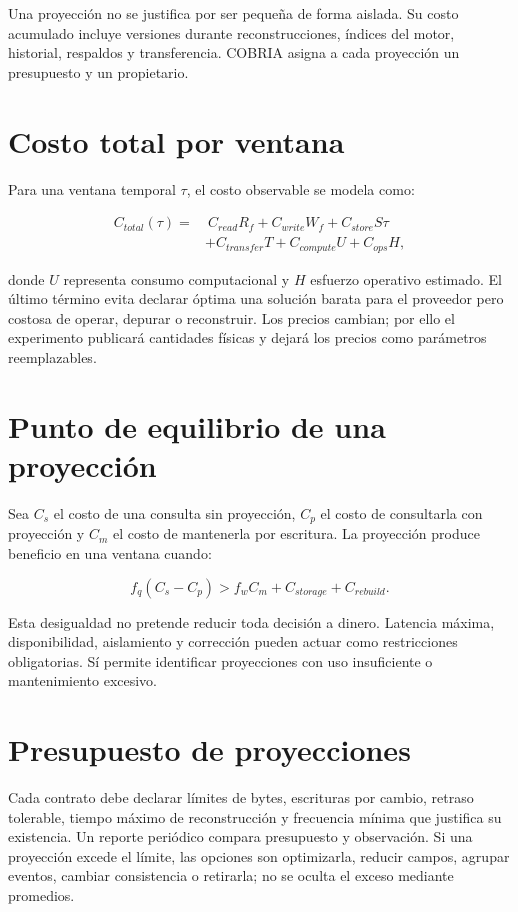 Una proyección no se justifica por ser pequeña de forma aislada. Su costo acumulado
incluye versiones durante reconstrucciones, índices del motor, historial, respaldos y
transferencia. COBRIA asigna a cada proyección un presupuesto y un propietario.

\section{Costo total por ventana}

Para una ventana temporal $\tau$, el costo observable se modela como:

\begin{align}
C_{total}(\tau)=&\ C_{read}R_f + C_{write}W_f + C_{store}S\tau \\
&+ C_{transfer}T + C_{compute}U + C_{ops}H,
\label{eq:costo-total}
\end{align}

donde $U$ representa consumo computacional y $H$ esfuerzo operativo estimado. El último
término evita declarar óptima una solución barata para el proveedor pero costosa de
operar, depurar o reconstruir. Los precios cambian; por ello el experimento publicará
cantidades físicas y dejará los precios como parámetros reemplazables.

\section{Punto de equilibrio de una proyección}

Sea $C_s$ el costo de una consulta sin proyección, $C_p$ el costo de consultarla con
proyección y $C_m$ el costo de mantenerla por escritura. La proyección produce beneficio
en una ventana cuando:

\begin{equation}
f_q(C_s-C_p)>f_wC_m+C_{storage}+C_{rebuild}.
\label{eq:break-even}
\end{equation}

Esta desigualdad no pretende reducir toda decisión a dinero. Latencia máxima,
disponibilidad, aislamiento y corrección pueden actuar como restricciones obligatorias.
Sí permite identificar proyecciones con uso insuficiente o mantenimiento excesivo.

\section{Presupuesto de proyecciones}

Cada contrato debe declarar límites de bytes, escrituras por cambio, retraso tolerable,
tiempo máximo de reconstrucción y frecuencia mínima que justifica su existencia. Un
reporte periódico compara presupuesto y observación. Si una proyección excede el límite,
las opciones son optimizarla, reducir campos, agrupar eventos, cambiar consistencia o
retirarla; no se oculta el exceso mediante promedios.

